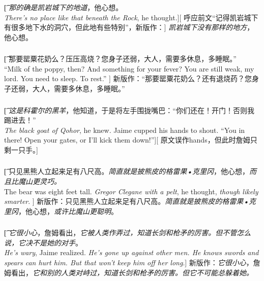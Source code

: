 \documentclass[12pt,a4paper]{article}
\begin{document}
\subsubsection{}\t[
\emph{那的确是凯岩城下的地道}，他心想。\\
\emph{There's no place like that beneath the Rock}, he thought.][
呼应前文“记得凯岩城下有很多地下水的洞穴，但此地有些特别”，新版作：]
\emph{凯岩城下没有那样的地方}，他心想。

\subsubsection{}\t[
那要罂粟花奶么？压压高烧？您身子还弱，大人，需要多休息，多睡眠。”\\
“Milk of the poppy, then? And something for your fever? You are still weak, my lord. You need to sleep. To rest.” ]
新版作：“那要罂粟花奶么？还有退烧药？您身子还弱，大人，需要多休息，多睡眠。”

\subsubsection{}\t[
\emph{这是科霍尔的黑羊}，他知道，于是将左手围拢嘴巴：“你们还在！开门！否则我踢进去！”\\
\emph{The black goat of Qohor}, he knew. Jaime cupped his hands to shout. “You in there! Open your gates, or I'll kick them down!”][
原文误作hands，但此时詹姆只剩一只手。]

\subsubsection{}\t[
只见黑熊人立起来足有八尺高。\emph{简直就是披熊皮的格雷果•克里冈}，他心想，\emph{而且比魔山更灵巧。}\\
The bear was eight feet tall. \emph{Gregor Clegane with a pelt}, he thought, \emph{though likely smarter}. ]
新版作：只见黑熊人立起来足有八尺高。\emph{简直就是披熊皮的格雷果•克里冈}，他心想，\emph{或许比魔山更聪明}。
	
\subsubsection{}\t[	
	\emph{它很小心}，詹姆看出，\emph{它被人类作弄过，知道长剑和枪矛的厉害。但不管怎么说，它决不是她的对手}。\\
	\emph{He's wary}, Jaime realized. \emph{He's gone up against other men. He knows swords and spears can hurt him. But that won't keep him off her long}.]
	新版作：\emph{它很小心}，詹姆看出，\emph{它和别的人类对峙过，知道长剑和枪矛的厉害。但它不可能总躲着她。}
	
\end{document}
